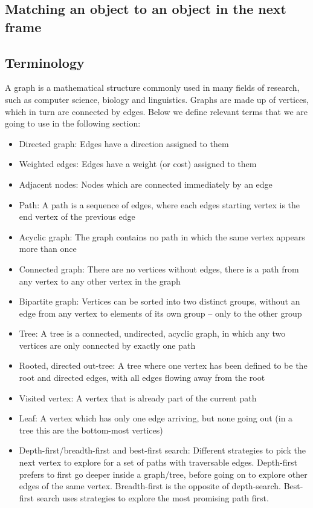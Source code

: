 \documentclass[9pt,lineno]{elife}
\begin{document}
\begin{appendixbox}
\section{Matching an object to an object in the next frame} \label{sec:matching_graph}

\subsection{Terminology}

A graph is a mathematical structure commonly used in many fields of research, such as computer science, biology and linguistics. Graphs are made up of vertices, which in turn are connected by edges. Below we define relevant terms that we are going to use in the following section:

\begin{itemize}
    \item Directed graph: Edges have a direction assigned to them
    \item Weighted edges: Edges have a weight (or cost) assigned to them
    \item Adjacent nodes: Nodes which are connected immediately by an edge
    \item Path: A path is a sequence of edges, where each edges starting vertex is the end vertex of the previous edge
    \item Acyclic graph: The graph contains no path in which the same vertex appears more than once
    \item Connected graph: There are no vertices without edges, there is a path from any vertex to any other vertex in the graph
    \item Bipartite graph: Vertices can be sorted into two distinct groups, without an edge from any vertex to elements of its own group -- only to the other group
    \item Tree: A tree is a connected, undirected, acyclic graph, in which any two vertices are only connected by exactly one path
    \item Rooted, directed out-tree: A tree where one vertex has been defined to be the root and directed edges, with all edges flowing away from the root
    \item Visited vertex: A vertex that is already part of the current path
    \item Leaf: A vertex which has only one edge arriving, but none going out (in a tree this are the bottom-most vertices)
    \item Depth-first/breadth-first and best-first search: Different strategies to pick the next vertex to explore for a set of paths with traversable edges. Depth-first prefers to first go deeper inside a graph/tree, before going on to explore other edges of the same vertex. Breadth-first is the opposite of depth-search. Best-first search uses strategies to explore the most promising path first.
\end{itemize}


\end{appendixbox}
\end{document}
